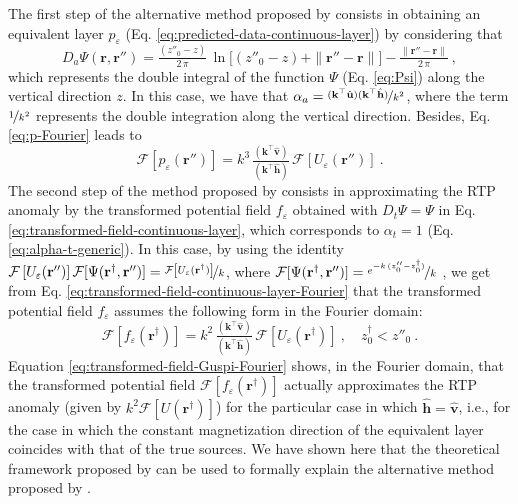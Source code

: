 The first step of the alternative method proposed by \cite{guspi_novara2009} consists in obtaining an equivalent layer 
$p_{\varepsilon}$ (Eq. \ref{eq:predicted-data-continuous-layer}) by considering that
\begin{equation}
	D_{a}\Psi(\mathbf{r}, \mathbf{r}'') = \tfrac{\left( z''_{0} - z \right)}{2 \, \pi} \, 
	\ln{\Big[} \left( z''_{0} - z \right) + \| \mathbf{r}'' - \mathbf{r} \| {\Big]} - 
	\tfrac{\| \mathbf{r}'' - \mathbf{r} \|}{2 \, \pi} \: ,
	\label{eq:kernel-Fourier-Guspi}
\end{equation}
which represents the double integral of the function $\Psi$ (Eq. \ref{eq:Psi}) along the vertical direction $z$.
In this case, we have that $\alpha_{a} = \nicefrac{(\mathbf{k}^{\top} \hat{\mathbf{u}}) (\mathbf{k}^{\top} \hat{\mathbf{h}})}{k^{2}}$, 
where the term $\nicefrac{1}{k^{2}}$ represents the double integration along the vertical direction. 
Besides, Eq. \ref{eq:p-Fourier} leads to
\begin{equation}
	\mathcal{F} [ p_{\varepsilon}(\mathbf{r}'') ] =
	k^{3} \, \tfrac{\left(\mathbf{k}^{\top} \hat{\mathbf{v}} \right)}{\left(\mathbf{k}^{\top} \hat{\mathbf{h}} \right)} \,
	\mathcal{F} \left[ U_{\varepsilon}(\mathbf{r}'') \right] \: .
	\label{eq:p-Fourier-guspi}
\end{equation}
The second step of the method proposed by \cite{guspi_novara2009} consists in approximating the RTP anomaly by
the transformed potential field $f_{\varepsilon}$ obtained with $D_{t}\Psi = \Psi$ in Eq. 
\ref{eq:transformed-field-continuous-layer}, which corresponds to $\alpha_{t} = 1$ (Eq. \ref{eq:alpha-t-generic}).
In this case, by using the identity 
$\mathcal{F} \left[ U_{\varepsilon}(\mathbf{r}'') \right] \mathcal{F} [ \Psi(\mathbf{r}^{\dagger}, \mathbf{r}'') ] = 
\nicefrac{\mathcal{F} \left[ U_{\varepsilon}(\mathbf{r}^{\dagger}) \right]}{k}$, where 
$\mathcal{F} [ \Psi(\mathbf{r}^{\dagger}, \mathbf{r}'') ] = \nicefrac{e^{-k \, (z''_{0} - z^{\dagger}_{0})}}{k}$ 
\citep[e.g.,][p. 275]{blakely1996}, 
we get from Eq. \ref{eq:transformed-field-continuous-layer-Fourier}
that the transformed potential field $f_{\varepsilon}$ assumes the following form in the Fourier domain:
\begin{equation}
	\mathcal{F} [ f_{\varepsilon}(\mathbf{r}^{\dagger}) ] =
	k^{2} \, \tfrac{\left(\mathbf{k}^{\top} \hat{\mathbf{v}} \right)}{\left(\mathbf{k}^{\top} \hat{\mathbf{h}} \right)}
	\, \mathcal{F} \left[ U_{\varepsilon}(\mathbf{r}^{\dagger}) \right] \: , 
	\quad z^{\dagger}_{0} < z''_{0} \: .
	\label{eq:transformed-field-Guspi-Fourier}
\end{equation}
Equation \ref{eq:transformed-field-Guspi-Fourier} shows, in the Fourier domain, that the transformed potential field 
$\mathcal{F} [ f_{\varepsilon}(\mathbf{r}^{\dagger}) ]$ actually approximates the RTP anomaly 
(given by $k^{2} \mathcal{F} \left[ U(\mathbf{r}^{\dagger}) \right]$) for the particular case in which 
$\hat{\mathbf{h}} = \hat{\mathbf{v}}$, i.e., for the case in which the constant magnetization direction of 
the equivalent layer coincides with that of the true sources.
We have shown here that the theoretical framework proposed by \cite{oliveirajr_etal2026_1} can be used to formally 
explain the alternative method proposed by \cite{guspi_novara2009}.
